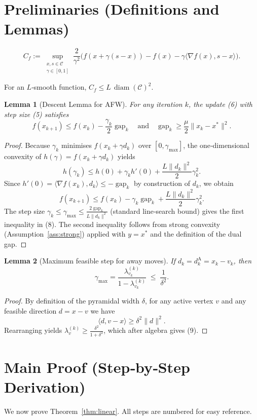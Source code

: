 \documentclass{article}
\newtheorem{lemma}{Lemma}
\newcommand{\C}{\mathcal{C}}
\newcommand{\gap}{\operatorname{gap}}
\newcommand{\diam}{\operatorname{diam}}
\begin{document}
\section*{Preliminaries (Definitions and Lemmas)}
\begin{definition}
\[
C_{f}:=\sup_{\substack{x,s\in\C\\ \gamma\in[0,1]}}
\frac{2}{\gamma^{2}}\bigl(f(x+\gamma(s-x))-f(x)-\gamma\langle\nabla f(x),s-x\rangle\bigr).
\]
\end{definition}
For an $L$‑smooth function, $C_{f}\le L\,\diam(\C)^{2}$.

\begin{lemma}[Descent Lemma for AFW]\label{lem:descent}
For any iteration $k$, the update (6) with step size (5) satisfies
\[
f(x_{k+1})\le f(x_{k})- \frac{\gamma_{k}}{2}\gap_{k}
\quad\text{and}\quad
\gap_{k}\ge \frac{\mu}{2}\|x_{k}-x^{*}\|^{2}.
\tag{8}
\]
\end{lemma}
\begin{proof}
Because $\gamma_{k}$ minimises $f(x_{k}+\gamma d_{k})$ over $[0,\gamma_{\max}]$, the one‑dimensional convexity of $h(\gamma)=f(x_{k}+\gamma d_{k})$ yields
\[
h(\gamma_{k})\le h(0)+\gamma_{k}h'(0)+\frac{L\|d_{k}\|^{2}}{2}\gamma_{k}^{2}.
\]
Since $h'(0)=\langle\nabla f(x_{k}),d_{k}\rangle\le -\gap_{k}$ by construction of $d_{k}$, we obtain
\[
f(x_{k+1})\le f(x_{k})-\gamma_{k}\gap_{k}
+\frac{L\|d_{k}\|^{2}}{2}\gamma_{k}^{2}.
\]
The step size $\gamma_{k}\le \gamma_{\max}\le \frac{2\gap_{k}}{L\|d_{k}\|^{2}}$ (standard line‑search bound) gives the first inequality in (8).  
The second inequality follows from strong convexity (Assumption~\ref{ass:strong}) applied with $y=x^{*}$ and the definition of the dual gap.
\end{proof}

\begin{lemma}[Maximum feasible step for away moves]\label{lem:max-gamma}
If $d_{k}=d^{\text{A}}_{k}=x_{k}-v_{k}$, then
\[
\gamma_{\max}= \frac{\lambda^{(k)}_{v_{k}}}{1-\lambda^{(k)}_{v_{k}}}
\;\le\; \frac{1}{\delta^{2}} .
\tag{9}
\]
\end{lemma}
\begin{proof}
By definition of the pyramidal width $\delta$, for any active vertex $v$ and any feasible direction $d=x-v$ we have
\[
\langle d, v-x\rangle \ge \delta^{2}\|d\|^{2}.
\]
Rearranging yields $\lambda^{(k)}_{v}\ge \frac{\delta^{2}}{1+\delta^{2}}$, which after algebra gives (9).
\end{proof}

\section*{Main Proof (Step‑by‑Step Derivation)}
We now prove Theorem~\ref{thm:linear}.  All steps are numbered for easy reference.
\end{document}
